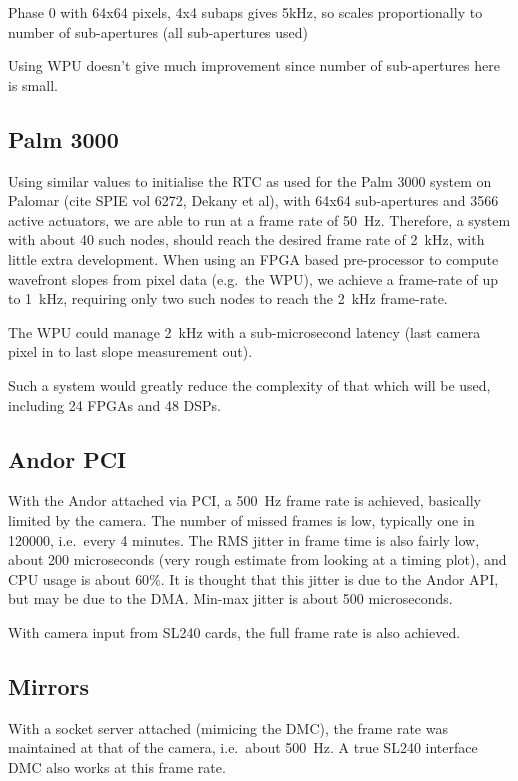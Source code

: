 \documentclass[a4,10pt]{article}
\begin{document}
Phase 0 with 64x64 pixels, 4x4 subaps gives 5kHz, so scales
proportionally to number of sub-apertures (all sub-apertures used)

Using WPU doesn't give much improvement since number of sub-apertures
here is small.  

\subsection{Palm 3000}
Using similar values to initialise the RTC as used for the Palm 3000
system on Palomar (cite SPIE vol 6272, Dekany et al), with 64x64
sub-apertures and 3566 active actuators, we are able to run at a frame
rate of 50~Hz.  Therefore, a system with about 40 such nodes, should
reach the desired frame rate of 2~kHz, with little extra development.
When using an FPGA based pre-processor to compute wavefront slopes
from pixel data (e.g.\ the WPU), we achieve a frame-rate of up to
1~kHz, requiring only two such nodes to reach the 2~kHz frame-rate.

The WPU could manage 2~kHz with a sub-microsecond latency (last camera
pixel in to last slope measurement out).

Such a system would greatly reduce the complexity of that which will
be used, including 24 FPGAs and 48 DSPs.

\subsection{Andor PCI}
With the Andor attached via PCI, a 500~Hz frame rate is achieved,
basically limited by the camera.  The number of missed frames is low,
typically one in 120000, i.e.\ every 4 minutes.  The RMS jitter in
frame time is also fairly low, about 200 microseconds (very rough
estimate from looking at a timing plot), and CPU usage is about
$60\%$.  It is thought that this jitter is due to the Andor API, but
may be due to the DMA.  Min-max jitter is about 500 microseconds.  

With camera input from SL240 cards, the full frame rate is also achieved.



\subsection{Mirrors}
With a socket server attached (mimicing the DMC), the frame rate was
maintained at that of the camera, i.e.\ about 500~Hz.  A true SL240
interface DMC also works at this frame rate.
\end{document}
